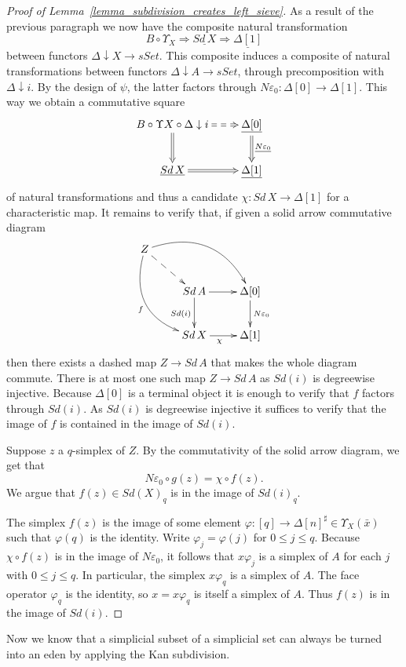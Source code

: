 \begin{proof}[Proof of Lemma~\ref{lemma_subdivision_creates_left_sieve}]
As a result of the previous paragraph we now have the composite natural transformation
\[B\circ \Upsilon _X\Rightarrow \underline{Sd\, X} \Rightarrow \underline{\Delta [1]} \]
between functors $\Delta \downarrow X\to sSet$. This composite induces a composite of natural transformations between functors $\Delta \downarrow A\to sSet$, through precomposition with $\Delta \downarrow i$. By the design of $\psi$, the latter factors through $N\varepsilon _0:\Delta [0]\to \Delta [1]$. This way we obtain a commutative square
\begin{displaymath}
\xymatrix{
B\circ \Upsilon X\circ \Delta \downarrow i \ar@{=>}[d] \ar@{==>}[r] & \underline{\Delta [0]} \ar@{=>}[d]^{\underline{N\varepsilon _0} } \\
\underline{Sd\, X} \ar@{=>}[r] & \underline{\Delta [1]}
}
\end{displaymath}
of natural transformations and thus a candidate $\chi :Sd\, X\to \Delta [1]$ for a characteristic map. It remains to verify that, if given a solid arrow commutative diagram
\begin{displaymath}
 \xymatrix{
 Z \ar@/^2pc/[drr] \ar@{-->}[dr] \ar@/_2pc/[ddr]_f \\
 & Sd\, A \ar[d]_{Sd(i)} \ar[r] & \Delta [0] \ar[d]^{N\varepsilon _0} \\
 & Sd\, X \ar[r]_(.45)\chi & \Delta [1]
 }
\end{displaymath}
then there exists a dashed map $Z\to Sd\, A$ that makes the whole diagram commute. There is at most one such map $Z\to Sd\, A$ as $Sd(i)$ is degreewise injective. Because $\Delta [0]$ is a terminal object it is enough to verify that $f$ factors through $Sd(i)$. As $Sd(i)$ is degreewise injective it suffices to verify that the image of $f$ is contained in the image of $Sd(i)$.

Suppose $z$ a $q$-simplex of $Z$. By the commutativity of the solid arrow diagram, we get that
\[N\varepsilon _0 \circ g(z)=\chi \circ f(z).\]
We argue that $f(z)\in Sd(X)_q$ is in the image of $Sd(i)_q$.

The simplex $f(z)$ is the image of some element $\varphi :[q]\to \Delta [n]^\sharp \in \Upsilon _X(\bar{x} )$ such that $\varphi (q)$ is the identity. Write $\varphi _j=\varphi (j)$ for $0\leq j\leq q$. Because $\chi \circ f(z)$ is in the image of $N\varepsilon _0$, it follows that $x\varphi _j$ is a simplex of $A$ for each $j$ with $0\leq j\leq q$. In particular, the simplex $x\varphi _q$ is a simplex of $A$. The face operator $\varphi _q$ is the identity, so $x=x\varphi _q$ is itself a simplex of $A$. Thus $f(z)$ is in the image of $Sd(i)$.
\end{proof}
\noindent Now we know that a simplicial subset of a simplicial set can always be turned into an eden by applying the Kan subdivision.

